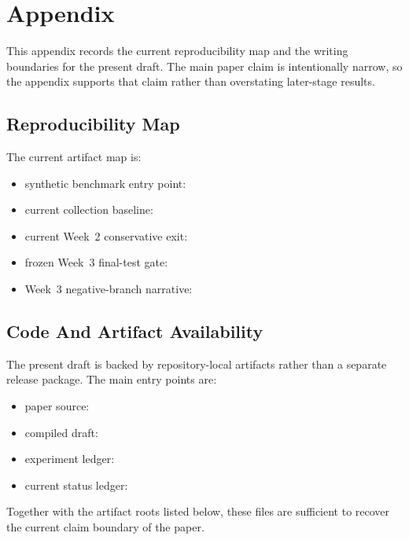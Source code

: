 \section{Appendix}

This appendix records the current reproducibility map and the writing boundaries for the present draft. The main paper claim is intentionally narrow, so the appendix supports that claim rather than overstating later-stage results.

\subsection{Reproducibility Map}

The current artifact map is:

\begin{itemize}
  \item synthetic benchmark entry point: 
  \item current collection baseline: 
  \item current Week~2 conservative exit: 
  \item frozen Week~3 final-test gate: 
  \item Week~3 negative-branch narrative: 
\end{itemize}

\subsection{Code And Artifact Availability}

The present draft is backed by repository-local artifacts rather than a separate release package. The main entry points are:

\begin{itemize}
  \item paper source: 
  \item compiled draft: 
  \item experiment ledger: 
  \item current status ledger: 
\end{itemize}

Together with the artifact roots listed below, these files are sufficient to recover the current claim boundary of the paper.

